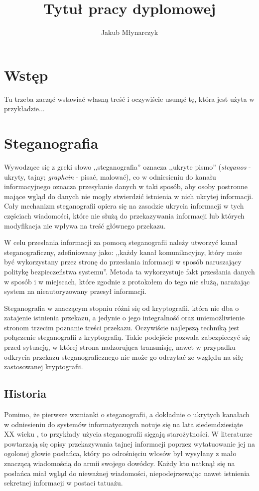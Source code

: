 \documentclass[a4paper,12pt,twoside,openany]{report}
\title{Tytuł pracy dyplomowej}
\author{Jakub Młynarczyk}
\begin{document}
\maketitle

\chapter{Wstęp}
Tu trzeba zacząć wstawiać własną treść i oczywiście usunąć tę, która jest użyta w przykładzie...



\chapter{Steganografia}
Wywodzące się z greki słowo ,,steganografia'' oznacza ,,ukryte pismo'' 
(\textit{steganos} - ukryty, tajny; \textit{graphein} - pisać, malować), co w 
odniesieniu do kanału informacyjnego oznacza przesyłanie danych w taki sposób, 
aby osoby postronne mające wgląd do danych nie mogły stwierdzić istnienia w nich 
ukrytej informacji. Cały mechanizm steganografii opiera się na zasadzie ukrycia 
informacji w tych częściach wiadomości, które nie służą do przekazywania 
informacji lub których modyfikacja nie wpływa na treść głównego przekazu.

W celu przesłania informacji za pomocą steganografii należy utworzyć kanał 
steganograficzny, zdefiniowany \cite{USDoD}  jako: ,,każdy kanał komunikacyjny, 
który może być wykorzystany przez stronę do przesłania informacji w sposób 
naruszający politykę bezpieczeństwa systemu''. Metoda ta wykorzystuje fakt 
przesłania danych w sposób i w miejscach, które zgodnie z protokołem do tego nie 
służą, narażając system na nieautoryzowany przesył informacji.

Steganografia w znaczącym stopniu różni się od kryptografii, która nie dba o 
zatajenie istnienia przekazu, a jedynie o jego integralność oraz uniemożliwienie 
stronom trzecim poznanie treści przekazu. Oczywiście najlepszą techniką jest 
połączenie steganografii z kryptografią. Takie podejście pozwala zabezpieczyć 
się przed sytuacją, w której strona nadzorująca transmisję, nawet w przypadku 
odkrycia przekazu steganograficznego nie może go odczytać ze względu na siłę 
zastosowanej kryptografii.
\section{Historia}
Pomimo, że pierwsze wzmianki o steganografii, a dokładnie o ukrytych kanałach w 
odniesieniu do systemów informatycznych notuje się na lata siedemdziesiąte XX 
wieku \cite{FirstCC}, to przykłady użycia steganografii sięgają starożytności. W 
literaturze powtarzają się opisy przekazywania tajnej informacji poprzez 
wytatuowanie jej na ogolonej głowie posłańca, który po odrośnięciu włosów był 
wysyłany z mało znaczącą wiadomością do armii swojego dowódcy. Każdy kto natknął 
się na posłańca miał wgląd do nieważnej wiadomości, niepodejrzewając nawet 
istnienia sekretnej informacji w postaci tatuażu.
\end{document}

